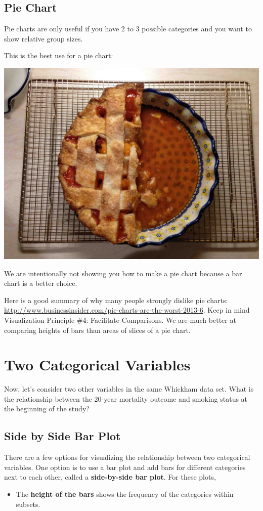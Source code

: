 \documentclass[]{book}
\providecommand{\tightlist}{%
  \setlength{\itemsep}{0pt}\setlength{\parskip}{0pt}}
\begin{document}
\hypertarget{pie-chart}{%
\subsection{Pie Chart}\label{pie-chart}}

Pie charts are only useful if you have 2 to 3 possible categories and you want to show relative group sizes.

This is the best use for a pie chart:

\includegraphics[width=.25\textwidth]{Photos/pie}

We are intentionally not showing you how to make a pie chart because a bar chart is a better choice.

Here is a good summary of why many people strongly dislike pie charts: \url{http://www.businessinsider.com/pie-charts-are-the-worst-2013-6}. Keep in mind Visualization Principle \#4: Facilitate Comparisons. We are much better at comparing heights of bars than areas of slices of a pie chart.

\hypertarget{two-categorical-variables}{%
\section{Two Categorical Variables}\label{two-categorical-variables}}

Now, let's consider two other variables in the same Whickham data set. What is the relationship between the 20-year mortality outcome and smoking status at the beginning of the study?

\hypertarget{side-by-side-bar-plot}{%
\subsection{Side by Side Bar Plot}\label{side-by-side-bar-plot}}

There are a few options for visualizing the relationship between two categorical variables. One option is to use a bar plot and add bars for different categories next to each other, called a \textbf{side-by-side bar plot}. For these plots,

\begin{itemize}
\tightlist
\item
  The \textbf{height of the bars} shows the frequency of the categories within subsets.
\end{itemize}
\end{document}
